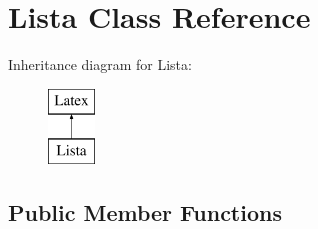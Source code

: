 \hypertarget{class_lista}{\section{Lista Class Reference}
\label{class_lista}
}
Inheritance diagram for Lista\-:\begin{figure}[H]
\begin{center}
\leavevmode
\includegraphics[height=2.000000cm]{class_lista}
\end{center}
\end{figure}
\subsection*{Public Member Functions}
